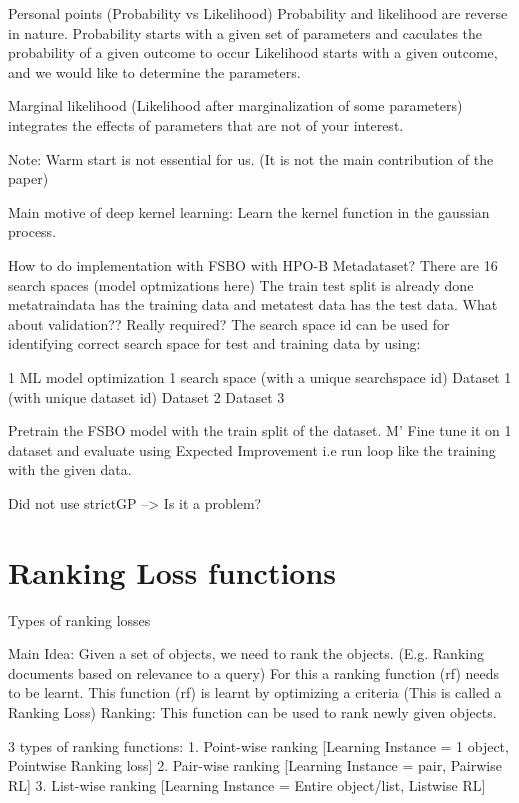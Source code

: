 \documentclass[11pt]{report}
\begin{document}
Personal points (Probability vs Likelihood)
    Probability and likelihood are reverse in nature.
    Probability starts with a given set of parameters and caculates the probability of a given outcome to occur
    Likelihood starts with a given outcome, and we would like to determine the parameters.

    Marginal likelihood (Likelihood after marginalization of some parameters)
        integrates the effects of parameters that are not of your interest.

Note:
    Warm start is not essential for us. (It is not the main contribution of the paper)

Main motive of deep kernel learning:
    Learn the kernel function in the gaussian process.

How to do implementation with FSBO with HPO-B Metadataset?
There are 16 search spaces (model optmizations here)
    The train test split is already done metatraindata has the training data and metatest data has the test data.
    What about validation?? Really required?
    The search space id can be used for identifying correct search space for test and training data by using:

1 ML model optimization
    1 search space (with a unique searchspace id)
        Dataset 1 (with unique dataset id)
        Dataset 2
        Dataset 3

Pretrain the FSBO model with the train split of the dataset. M'
Fine tune it on 1 dataset and evaluate using Expected Improvement
    i.e run loop like the training with the given data.

Did not use strictGP --> Is it a problem?

\section{Ranking Loss functions}
Types of ranking losses


Main Idea:
    Given a set of objects, we need to rank the objects. (E.g. Ranking documents based on relevance to a query)
    For this a ranking function (rf) needs to be learnt.
    This function (rf) is learnt by optimizing a criteria (This is called a Ranking Loss)
    Ranking: This function can be used to rank newly given objects.

3 types of ranking functions:
    1. Point-wise ranking [Learning Instance = 1 object, Pointwise Ranking loss]
    2. Pair-wise ranking [Learning Instance = pair, Pairwise RL]
    3. List-wise ranking [Learning Instance = Entire object/list, Listwise RL]
\end{document}
